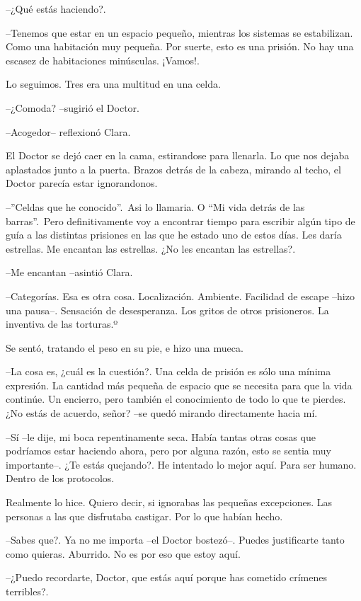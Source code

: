 --¿Qué estás haciendo?.

--Tenemos que estar en un espacio pequeño, mientras los sistemas se
estabilizan. Como una habitación muy pequeña. Por suerte, esto es una
prisión. No hay una escasez de habitaciones minúsculas. ¡Vamos!.

Lo seguimos. Tres era una multitud en una celda.

--¿Comoda? --sugirió el Doctor.

--Acogedor-- reflexionó Clara.

El Doctor se dejó caer en la cama, estirandose para llenarla. Lo que nos
dejaba aplastados junto a la puerta. Brazos detrás de la cabeza, mirando
al techo, el Doctor parecía estar ignorandonos.

--''Celdas que he conocido''.~Asi lo llamaria. O ``Mi vida detrás de
las barras''.~Pero definitivamente voy a encontrar tiempo para escribir
algún tipo de guía a las distintas prisiones en las que he estado uno de
estos días. Les daría estrellas. Me encantan las estrellas. ¿No les
encantan las estrellas?.

--Me encantan --asintió Clara.

--Categorías. Esa es otra cosa. Localización. Ambiente. Facilidad de
escape --hizo una pausa--. Sensación de desesperanza. Los gritos de
otros prisioneros. La inventiva de las torturas.º

Se sentó, tratando el peso en su pie, e hizo una mueca.

--La cosa es, ¿cuál es la cuestión?. Una celda de prisión es sólo una
mínima expresión. La cantidad más pequeña de espacio que se necesita
para que la vida continúe. Un encierro, pero también el conocimiento de
todo lo que te pierdes. ¿No estás de acuerdo, señor? --se quedó mirando
directamente hacia mí.

--Sí --le dije, mi boca repentinamente seca. Había tantas otras cosas
que podríamos estar haciendo ahora, pero por alguna razón, esto se
sentia muy importante--. ¿Te estás quejando?. He intentado lo mejor
aquí. Para ser humano. Dentro de los protocolos.

Realmente lo hice. Quiero decir, si ignorabas las pequeñas excepciones.
Las personas a las que disfrutaba castigar. Por lo que habían hecho.

--Sabes que?. Ya no me importa --el Doctor bostezó--. Puedes
justificarte tanto como quieras. Aburrido. No es por eso que estoy aquí.

--¿Puedo recordarte, Doctor, que estás aquí porque has cometido
crímenes terribles?.

